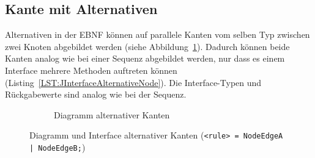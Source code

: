 \documentclass[../InterneDSLs.tex]{subfiles}
\begin{document}
\subsection{Kante mit Alternativen}
Alternativen in der EBNF können auf parallele Kanten vom selben Typ zwischen zwei Knoten abgebildet werden (siehe Abbildung~\ref{FIG:DiagramAlternativeNode}). Dadurch können beide Kanten analog wie bei einer Sequenz abgebildet werden, nur dass es einem Interface mehrere Methoden auftreten können (Listing~\ref{LST:JInterfaceAlternativeNode}). Die Interface-Typen und Rückgabewerte sind analog wie bei der Sequenz.
\begin{figure}[ht]
\centering
  \begin{subfigure}[c]{0.49\textwidth}
    \caption{Diagramm alternativer Kanten}
    \label{FIG:DiagramAlternativeNode}
  \end{subfigure}
  \begin{subfigure}[c]{0.49\textwidth}
    
  \end{subfigure}
  \caption{Diagramm und Interface alternativer Kanten (\texttt{<rule> = NodeEdgeA | NodeEdgeB;})}
  \label{FIG:AlternativeNode}
\end{figure}
\end{document}

